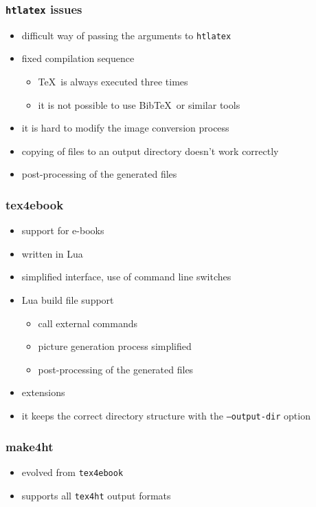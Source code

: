 \begin{frame}
  \frametitle{\texttt{htlatex} issues}
  \begin{itemize}
    \item difficult way of passing the arguments to \texttt{htlatex}
    \item fixed compilation sequence
      \begin{itemize}
        \item \TeX\ is always executed three times
        \item it is not possible to use Bib\TeX\ or similar tools
      \end{itemize}
    \item it is hard to modify the image conversion process
    \item copying of files to an output directory doesn't work correctly
    \item post-processing of the generated files
  \end{itemize}
\end{frame}

\begin{frame}
  \frametitle{tex4ebook}
  \begin{itemize}
    \item support for e-books
    \item written in Lua
    \item simplified interface, use of command line switches
    \item Lua build file support
      \begin{itemize}
        \item call external commands
        \item picture generation process simplified
        \item post-processing of the generated files
      \end{itemize}
    \item extensions
    \item it keeps the correct directory structure with the \texttt{--output-dir} option
  \end{itemize}
\end{frame}

\begin{frame}
  \frametitle{make4ht}
  \begin{itemize}
    \item evolved from \texttt{tex4ebook}
    \item supports all \texttt{tex4ht} output formats
  \end{itemize}

\end{frame}


